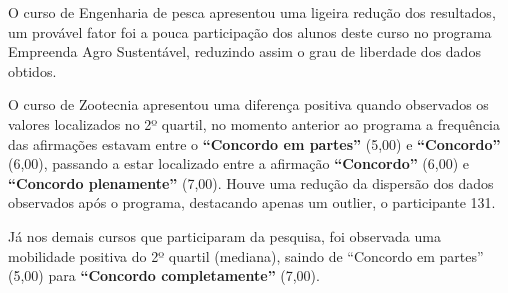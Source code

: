 O curso de Engenharia de pesca apresentou uma ligeira redução dos resultados, um provável fator foi a pouca participação dos alunos deste curso no programa Empreenda Agro Sustentável, reduzindo assim o grau de liberdade dos dados obtidos.  

O curso de Zootecnia apresentou uma diferença positiva quando observados os valores localizados no 2º quartil, no momento anterior ao programa a frequência das afirmações estavam entre o \textbf{“Concordo em partes”} (5,00) e \textbf{“Concordo”} (6,00), passando a estar localizado entre a afirmação \textbf{“Concordo”} (6,00) e \textbf{“Concordo plenamente”} (7,00). Houve uma redução da dispersão dos dados observados após o programa, destacando apenas um outlier, o participante 131. 

Já nos demais cursos que participaram da pesquisa, foi observada uma mobilidade positiva do 2º quartil (mediana), saindo de “Concordo em partes” (5,00) para \textbf{“Concordo completamente”} (7,00).






